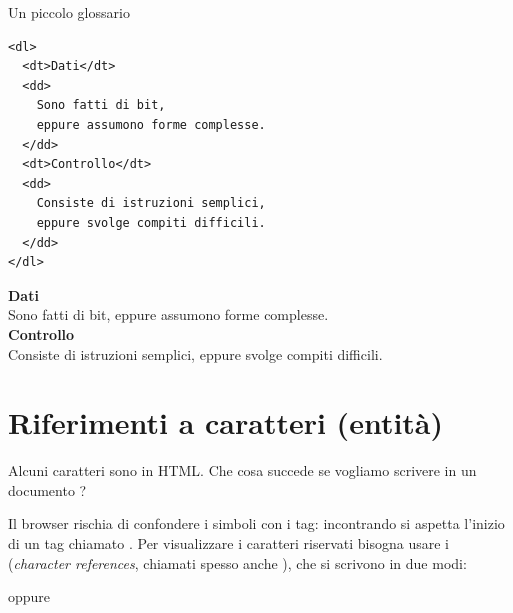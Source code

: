 \begin{esempio}{Un piccolo glossario}
\begin{affianco}[0.5]
\begin{lstlisting}[style=html, name=glossario.html]
<dl>
  <dt>Dati</dt>
  <dd>
    Sono fatti di bit,
    eppure assumono forme complesse.
  </dd>
  <dt>Controllo</dt>
  <dd>
    Consiste di istruzioni semplici,
    eppure svolge compiti difficili.
  </dd>
</dl>
\end{lstlisting}
\risultato
\begin{browser}
  \textbf{Dati}\\
  \hspace*{2em}Sono fatti di bit, eppure assumono forme complesse.\\[3pt]
  \textbf{Controllo}\\
  \hspace*{2em}Consiste di istruzioni semplici, eppure svolge compiti difficili.
\end{browser}
\end{affianco}
\end{esempio}

\section{Riferimenti a caratteri (entità)}

Alcuni caratteri sono  in HTML. Che cosa succede se vogliamo
scrivere in un documento ?

Il browser rischia di confondere i simboli con i tag: incontrando  si
aspetta l'inizio di un tag chiamato . Per visualizzare i caratteri
riservati bisogna usare i  (\textit{character
references}, chiamati spesso anche ), che si scrivono in due modi:

\begin{center}
   \qquad oppure \qquad {}
\end{center}

